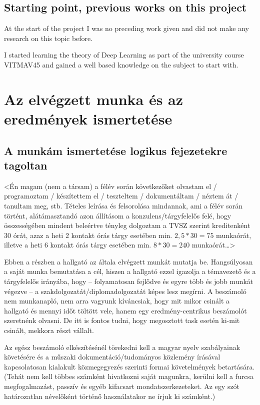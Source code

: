 \documentclass[11pt,a4paper,oneside]{article}
\begin{document}
\subsection{Starting point, previous works on this project}
\label{sec:prev_works}

At the start of the project I was no preceding work given and did not make any research on this topic before.

I started learning the theory of Deep Learning as part of the university course VITMAV45 and gained a well based 
knowledge on the subject to start with.

\newpage
\section{Az elvégzett munka és az eredmények ismertetése}
\label{sec:az-elvegzett-munka}


\subsection{A munkám ismertetése logikus fejezetekre tagoltan}
\label{sec:a-munkam-ismert}
<Én magam (nem a társam) a félév során következőket olvastam el /
programoztam / készítettem el / teszteltem / dokumentáltam / néztem át
/ tanultam meg, stb.  Tételes leírása és felsorolása mindannak, ami a
félév során történt, alátámasztandó azon állításom a
konzulens/tárgyfelelős felé, hogy összességében mindent beleértve
tényleg dolgoztam a TVSZ szerint kreditenként 30 órát, azaz a heti 2
kontakt órás tárgy esetében min. $2,5*30 = 75$ munkaórát, illetve a
heti 6 kontakt órás tárgy esetében min. $8*30 = 240$ munkaórát\dots>

Ebben a részben a hallgató az általa elvégzett munkát mutatja
be. Hangsúlyosan a saját munka bemutatása a cél, hiszen a hallgató
ezzel igazolja a témavezető és a tárgyfelelős irányába, hogy --
folyamatosan fejlődve és egyre több és jobb munkát végezve -- a
szakdolgozatát/diplomadolgozatát képes lesz megírni.  A beszámoló nem
munkanapló, nem arra vagyunk kíváncsiak, hogy mit mikor csinált a
hallgató és mennyi időt töltött vele, hanem egy eredmény-centrikus
beszámolót szeretnénk olvasni.  De itt is fontos tudni, hogy
megosztott task esetén ki-mit csinált, mekkora részt vállalt.

Az egész beszámoló elkészítésénél törekedni kell a magyar nyelv
szabályainak követésére és a műszaki dokumentáció/tudományos közlemény
írásával kapcsolatosan kialakult közmegegyezés szerinti formai
követelmények betartására.  (Tehát nem kell többes számként hivatkozni
saját magunkra, kerülni kell a furcsa megfogalmazást, passzív és egyéb
kifacsart mondatszerkezeteket.  Az egy szót határozatlan névelőként
történő használatakor ne írjuk ki számként.)
\end{document}
